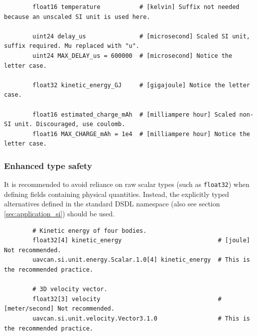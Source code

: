 \begin{remark}
    \begin{verbatim}
        float16 temperature           # [kelvin] Suffix not needed because an unscaled SI unit is used here.

        uint24 delay_us               # [microsecond] Scaled SI unit, suffix required. Mu replaced with "u".
        uint24 MAX_DELAY_us = 600000  # [microsecond] Notice the letter case.

        float32 kinetic_energy_GJ     # [gigajoule] Notice the letter case.

        float16 estimated_charge_mAh  # [milliampere hour] Scaled non-SI unit. Discouraged, use coulomb.
        float16 MAX_CHARGE_mAh = 1e4  # [milliampere hour] Notice the letter case.
    \end{verbatim}
\end{remark}

\subsubsection{Enhanced type safety}

It is recommended to avoid reliance on raw scalar types (such as \verb|float32|)
when defining fields containing physical quantities.
Instead, the explicitly typed alternatives defined in the standard DSDL namespace
 (also see section \ref{sec:application_si}) should be used.

\begin{remark}
    \begin{verbatim}
        # Kinetic energy of four bodies.
        float32[4] kinetic_energy                           # [joule] Not recommended.
        uavcan.si.unit.energy.Scalar.1.0[4] kinetic_energy  # This is the recommended practice.

        # 3D velocity vector.
        float32[3] velocity                                 # [meter/second] Not recommended.
        uavcan.si.unit.velocity.Vector3.1.0                 # This is the recommended practice.
    \end{verbatim}
\end{remark}
